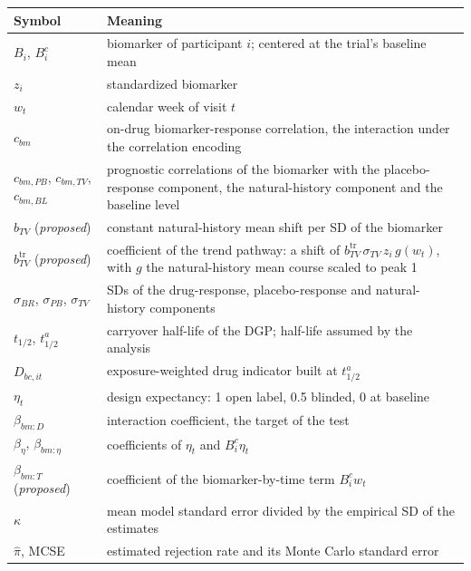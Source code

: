 \documentclass[
  11pt,
]{article}
\newcounter{none} %
\begin{document}
{\def\LTcaptype{none} %
\begin{longtable}[]{@{}
  >{\raggedright\arraybackslash}p{}
  >{\raggedright\arraybackslash}p{}@{}}
\toprule\noalign{}
\begin{minipage}[b]{\linewidth}\raggedright
Symbol
\end{minipage} & \begin{minipage}[b]{\linewidth}\raggedright
Meaning
\end{minipage} \\
\midrule\noalign{}
\endhead
\bottomrule\noalign{}
\endlastfoot
\(B_i\), \(B^c_i\) & biomarker of participant \(i\); centered at the trial's baseline mean \\
\(z_i\) & standardized biomarker \\
\(w_t\) & calendar week of visit \(t\) \\
\(c_{bm}\) & on-drug biomarker-response correlation, the interaction under the correlation encoding \\
\(c_{bm,PB}\), \(c_{bm,TV}\), \(c_{bm,BL}\) & prognostic correlations of the biomarker with the placebo-response component, the natural-history component and the baseline level \\
\(b_{TV}\) (\emph{proposed}) & constant natural-history mean shift per SD of the biomarker \\
\(b_{TV}^{\mathrm{tr}}\) (\emph{proposed}) & coefficient of the trend pathway: a shift of \(b_{TV}^{\mathrm{tr}}\,\sigma_{TV}\,z_i\,g(w_t)\), with \(g\) the natural-history mean course scaled to peak 1 \\
\(\sigma_{BR}\), \(\sigma_{PB}\), \(\sigma_{TV}\) & SDs of the drug-response, placebo-response and natural-history components \\
\(t_{1/2}\), \(t^a_{1/2}\) & carryover half-life of the DGP; half-life assumed by the analysis \\
\(D_{bc,it}\) & exposure-weighted drug indicator built at \(t^a_{1/2}\) \\
\(\eta_t\) & design expectancy: 1 open label, 0.5 blinded, 0 at baseline \\
\(\beta_{bm:D}\) & interaction coefficient, the target of the test \\
\(\beta_\eta\), \(\beta_{bm:\eta}\) & coefficients of \(\eta_t\) and \(B^c_i\eta_t\) \\
\(\beta_{bm:T}\) (\emph{proposed}) & coefficient of the biomarker-by-time term \(B^c_i w_t\) \\
\(\kappa\) & mean model standard error divided by the empirical SD of the estimates \\
\(\hat\pi\), MCSE & estimated rejection rate and its Monte Carlo standard error \\
\end{longtable}
}
\end{document}
